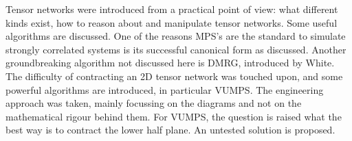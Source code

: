 Tensor networks were introduced from a practical point of view: what different kinds exist, how to reason about and manipulate tensor networks. Some useful algorithms are discussed. One of the reasons MPS's are the standard to simulate strongly correlated systems is its successful canonical form as discussed. Another groundbreaking algorithm not discussed here is DMRG, introduced by White. 
The difficulty of contracting an 2D tensor network was touched upon, and some powerful algorithms are introduced, in particular VUMPS. The engineering approach was taken, mainly focussing on the diagrams and not on the mathematical rigour behind them. For VUMPS, the question is raised what the best way is to contract the lower half plane. An untested solution is proposed.